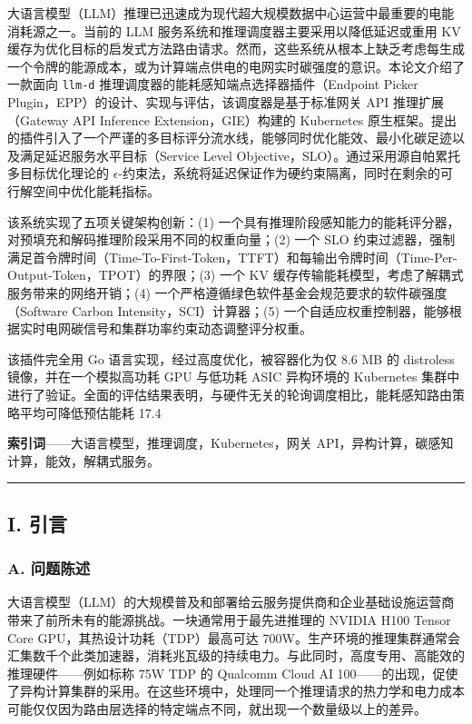 大语言模型（LLM）推理已迅速成为现代超大规模数据中心运营中最重要的电能消耗源之一。当前的 LLM 服务系统和推理调度器主要采用以降低延迟或重用 KV 缓存为优化目标的启发式方法路由请求。然而，这些系统从根本上缺乏考虑每生成一个令牌的能源成本，或为计算端点供电的电网实时碳强度的意识。本论文介绍了一款面向 \texttt{llm-d} 推理调度器的能耗感知端点选择器插件（Endpoint Picker Plugin，EPP）的设计、实现与评估，该调度器是基于标准网关 API 推理扩展（Gateway API Inference Extension，GIE）构建的 Kubernetes 原生框架。提出的插件引入了一个严谨的多目标评分流水线，能够同时优化能效、最小化碳足迹以及满足延迟服务水平目标（Service Level Objective，SLO）。通过采用源自帕累托多目标优化理论的 \texorpdfstring{\(\epsilon\)}{ε}-约束法，系统将延迟保证作为硬约束隔离，同时在剩余的可行解空间中优化能耗指标。

该系统实现了五项关键架构创新：(1) 一个具有推理阶段感知能力的能耗评分器，对预填充和解码推理阶段采用不同的权重向量；(2) 一个 SLO 约束过滤器，强制满足首令牌时间（Time-To-First-Token，TTFT）和每输出令牌时间（Time-Per-Output-Token，TPOT）的界限；(3) 一个 KV 缓存传输能耗模型，考虑了解耦式服务带来的网络开销；(4) 一个严格遵循绿色软件基金会规范要求的软件碳强度（Software Carbon Intensity，SCI）计算器；(5) 一个自适应权重控制器，能够根据实时电网碳信号和集群功率约束动态调整评分权重。

该插件完全用 Go 语言实现，经过高度优化，被容器化为仅 8.6 MB 的 distroless 镜像，并在一个模拟高功耗 GPU 与低功耗 ASIC 异构环境的 Kubernetes 集群中进行了验证。全面的评估结果表明，与硬件无关的轮询调度相比，能耗感知路由策略平均可降低预估能耗 17.4%

\textbf{索引词}——大语言模型，推理调度，Kubernetes，网关 API，异构计算，碳感知计算，能效，解耦式服务。

\begin{center}\rule{0.5\linewidth}{0.5pt}\end{center}

\subsection{I. 引言}\label{i.-introduction}

\subsubsection{A. 问题陈述}\label{a.-problem-statement}

大语言模型（LLM）的大规模普及和部署给云服务提供商和企业基础设施运营商带来了前所未有的能源挑战。一块通常用于最先进推理的 NVIDIA H100 Tensor Core GPU，其热设计功耗（TDP）最高可达 700W。生产环境的推理集群通常会汇集数千个此类加速器，消耗兆瓦级的持续电力。与此同时，高度专用、高能效的推理硬件——例如标称 75W TDP 的 Qualcomm Cloud AI 100——的出现，促使了异构计算集群的采用。在这些环境中，处理同一个推理请求的热力学和电力成本可能仅仅因为路由层选择的特定端点不同，就出现一个数量级以上的差异。

